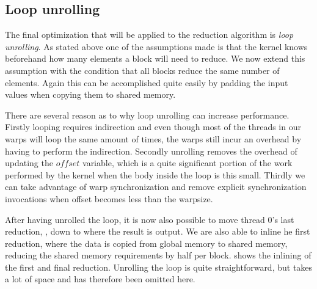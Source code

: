 \subsection{Loop unrolling}\label{sec:loopUnrolling}


The final optimization that will be applied to the reduction algorithm
is \textit{loop unrolling}. As stated above one of the assumptions
made is that the kernel knows beforehand how many elements a block
will need to reduce. We now extend this assumption with the condition
that all blocks reduce the same number of elements. Again this can be
accomplished quite easily by padding the input values when copying
them to shared memory. 

There are several reason as to why loop unrolling can increase
performance. Firstly looping requires indirection and even though most
of the threads in our warps will loop the same amount of times, the
warps still incur an overhead by having to perform the
indirection. Secondly unrolling removes the overhead of updating the
$offset$ variable, which is a quite significant portion of the work
performed by the kernel when the body inside the loop is this
small. Thirdly we can take advantage of warp synchronization and
remove explicit synchronization invocations when offset becomes less
than the warpsize.


After having unrolled the loop, it is now also possible to move thread
0's last reduction, , down to where the
result is output. We are also able to inline he first reduction, where
the data is copied from global memory to shared memory, reducing the
shared memory requirements by half per
block.  shows the inlining of the first and
final reduction. Unrolling the loop is quite straightforward, but
takes a lot of space and has therefore been omitted here.


